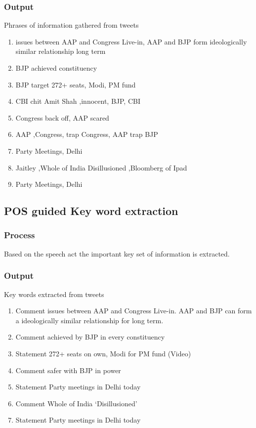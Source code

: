 \documentclass[conference]{IEEEtran}
\begin{document}
\subsubsection{\textbf{Output}}
Phrases of information gathered from tweets
\begin{enumerate}
\item{issues between AAP and Congress Live-in,  AAP and BJP form  ideologically similar relationship long term}
\item{BJP achieved constituency}
\item{BJP target 272+ seats, Modi, PM fund}
\item{CBI chit Amit Shah ,innocent, BJP, CBI }
\item{Congress back off, AAP scared}
\item{AAP ,Congress,  trap Congress, AAP  trap BJP}
\item{Party Meetings, Delhi}
\item{Jaitley ,Whole of India Disillusioned ,Bloomberg of Ipad}
\item{Party Meetings, Delhi}
\end{enumerate}

\subsection{POS guided Key word extraction}
\subsubsection{\textbf{Process}}
Based on the speech act the important key set of information is extracted.

\subsubsection{\textbf{Output}}
Key words extracted from tweets
\begin{enumerate}
\item{Comment
issues between AAP and Congress Live-in. AAP and BJP can form a ideologically similar relationship for long term.}
\item{Comment
achieved by BJP in every constituency}
\item{Statement
272+ seats on own, Modi for PM fund (Video)}
\item{Comment
 safer with BJP in power}
 \item{Statement
 Party meetings in Delhi today}
 \item{Comment
Whole of India `Disillusioned'}
\item{Statement
Party meetings in Delhi today}
\end{enumerate}
\end{document}
